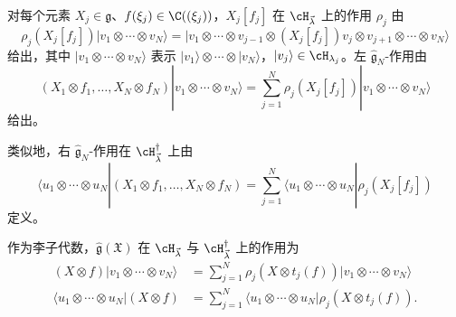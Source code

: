 对每个元素 $X_j\in\mathfrak{g}$、$f(\xi_j)\in\C((\xi_j))$，$X_j[f_j]$ 在 $\cH_{\vec{\lambda}}$ 上的作用 $\rho_j$ 由
\begin{equation}
\rho_j(X_j[f_j])|v_1\otimes\cdots\otimes v_N\rangle
=|v_1\otimes\cdots\otimes v_{j-1}\otimes(X_j[f_j])v_j\otimes v_{j+1}\otimes\cdots\otimes v_N\rangle \tag{3.3}
\end{equation}
给出，其中 $|v_1\otimes\cdots\otimes v_N\rangle$ 表示 $|v_1\rangle\otimes\cdots\otimes|v_N\rangle$，$|v_j\rangle\in\cH_{\lambda_j}$。左 $\hat{\mathfrak{g}}_N$-作用由
\begin{equation}
(X_1\otimes f_1,\dots,X_N\otimes f_N)|v_1\otimes\cdots\otimes v_N\rangle
=\sum_{j=1}^{N}\rho_j(X_j[f_j])|v_1\otimes\cdots\otimes v_N\rangle \tag{3.4}
\end{equation}
给出。


类似地，右 $\hat{\mathfrak{g}}_N$-作用在 $\cH^{\dagger}_{\vec{\lambda}}$ 上由
\begin{equation}
\langle u_1\otimes\cdots\otimes u_N|(X_1\otimes f_1,\dots,X_N\otimes f_N)
=\sum_{j=1}^{N}\langle u_1\otimes\cdots\otimes u_N|\rho_j(X_j[f_j]) \tag{3.5}
\end{equation}
定义。


作为李子代数，$\hat{\mathfrak{g}}(\mathfrak{X})$ 在 $\cH_{\vec{\lambda}}$ 与 $\cH^{\dagger}_{\vec{\lambda}}$ 上的作用为
\begin{align}
(X\otimes f)|v_1\otimes\cdots\otimes v_N\rangle
&=\sum_{j=1}^{N}\rho_j(X\otimes t_j(f))|v_1\otimes\cdots\otimes v_N\rangle \tag{3.6}\\
\langle u_1\otimes\cdots\otimes u_N|(X\otimes f)
&=\sum_{j=1}^{N}\langle u_1\otimes\cdots\otimes u_N|\rho_j(X\otimes t_j(f)). \tag{3.7}
\end{align}


